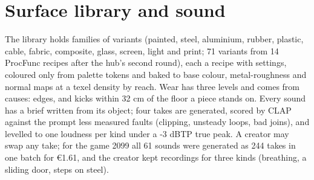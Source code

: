\section{Surface library and sound}\label{surface-library-and-sound}

The library holds families of variants (painted, steel, aluminium, rubber, plastic, cable, fabric, composite, glass, screen, light and print; 71 variants from 14 ProcFunc recipes after the hub's second round), each a recipe with settings, coloured only from palette tokens and baked to base colour, metal-roughness and normal maps at a texel density by reach. Wear has three levels and comes from causes: edges, and kicks within 32 cm of the floor a piece stands on. Every sound has a brief written from its object; four takes are generated, scored by CLAP against the prompt less measured faults (clipping, unsteady loops, bad joins), and levelled to one loudness per kind under a -3 dBTP true peak. A creator may swap any take; for the game 2099 all 61 sounds were generated as 244 takes in one batch for €1.61, and the creator kept recordings for three kinds (breathing, a sliding door, steps on steel).
